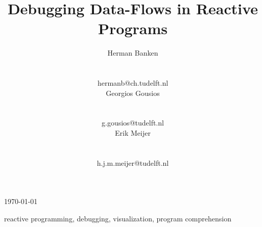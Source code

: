 \documentclass{acm_proc_article-sp}
\newcommand{\thesistitle}{Debugging Data-Flows in Reactive Programs}
\begin{document}
\title{\thesistitle}

\author{
    \alignauthor Herman Banken\\
    \\
    \begin{email}{hermanb@ch.tudelft.nl}
    \end{email}
    \alignauthor Georgios Gousios\\
    \\
    \begin{email}{g.gousios@tudelft.nl}
    \end{email}
    \alignauthor Erik Meijer\\
    \\
    \begin{email}{h.j.m.meijer@tudelft.nl}
    \end{email}
}

\begin{date}{\today}
\end{date}



\maketitle
\begin{abstract}
    
\end{abstract}


\begin{keywords}{reactive programming, debugging, visualization, program
    comprehension}
\end{keywords}
\end{document}
